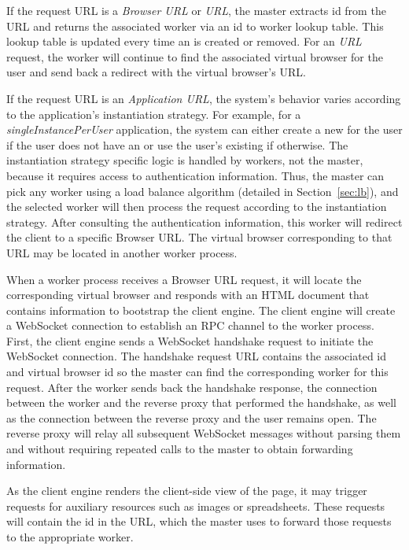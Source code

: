 If the request URL is a \emph{Browser URL} or \emph{\appins URL}, 
the master extracts \appins id from the URL and returns the associated
worker via an \appins id to worker lookup table.
This lookup table is updated every time an \appins{} is created or removed.
For an \emph{\appins URL} request, the worker will continue to find the associated
virtual browser for the user and send back a redirect with the virtual browser's URL.

If the request URL is an \emph{Application URL}, 
the system's behavior varies according to the application's instantiation strategy.
For example, for a \emph{singleInstancePerUser} application,
the system can either create a new \appins{} for the user if the user does not have an
\appins or use the user's existing \appins{} if otherwise.
The instantiation strategy specific logic is handled by workers, not the master,
because it requires access to authentication information.
Thus, the master can pick any worker using a load
balance algorithm (detailed in Section~\ref{sec:lb}),
and the selected worker will then process the request according
to the instantiation strategy.
After consulting the authentication information, this worker will redirect 
the client to a specific Browser URL.   The virtual browser corresponding
to that URL may be located in another worker process.

When a worker process receives a Browser URL request, it will locate the
corresponding virtual browser and responds with an HTML document that contains
information to bootstrap the client engine. 
The client engine will create a WebSocket connection to establish an RPC channel to
the worker process.
First, the client engine sends a WebSocket handshake request to initiate the
WebSocket connection.
The handshake request URL contains the associated \appins id and virtual browser
id so the master can find the corresponding worker for this request.
After the worker sends back the handshake response, the connection
between the worker and the reverse proxy that performed the handshake, 
as well as the connection between the reverse proxy and the user remains open. 
The reverse proxy will relay all subsequent WebSocket messages
without parsing them and without requiring repeated calls to the master
to obtain forwarding information.

As the client engine renders the client-side view of the page, it may trigger
requests for auxiliary resources such as images or spreadsheets. 
These requests will contain the \appins{} id in the URL, which the master
uses to forward those requests to the appropriate worker.

